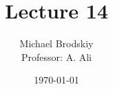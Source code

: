 


\title{Lecture 14}
\date{\today}
\author{Michael Brodskiy\\ \small Professor: A. Ali}



\maketitle

